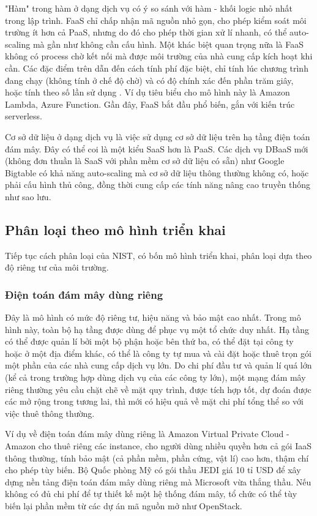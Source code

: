 \documentclass{article}
\begin{document}
"Hàm" trong hàm ở dạng dịch vụ có ý so sánh với hàm - khối logic nhỏ nhất trong
lập trình. FaaS chỉ chấp nhận mã nguồn nhỏ gọn, cho phép kiểm soát môi trường ít
hơn cả PaaS, nhưng do đó cho phép thời gian xử lí nhanh, có thể auto-scaling mà
gần như không cần cấu hình. Một khác biệt quan trọng nữa là FaaS không có
process chờ kết nối mà được môi trường của nhà cung cấp kích hoạt khi cần. Các
đặc điểm trên dẫn đến cách tính phí đặc biệt, chỉ tính lúc chương trình đang
chạy (không tính ở chế độ chờ) và có độ chính xác đến phần trăm giây, hoặc tính
theo số lần sử dụng \cite{CFPvF}. Ví dụ tiêu biểu cho mô hình này là Amazon
Lambda, Azure Function. Gần đây, FaaS bắt đầu phổ biến, gắn với kiến trúc
serverless.

Cơ sở dữ liệu ở dạng dịch vụ là việc sử dụng cơ sở dữ liệu trên hạ tầng điện
toán đám mây. Đây có thể coi là một kiểu SaaS hơn là PaaS. Các dịch vụ DBaaS mới
(không đơn thuần là SaaS với phần mềm cơ sở dữ liệu có sẵn) như Google Bigtable
có khả năng auto-scaling mà cơ sở dữ liệu thông thường không có, hoặc phải cấu
hình thủ công, đồng thời cung cấp các tính năng nâng cao truyền thống như sao
lưu.

\subsection{Phân loại theo mô hình triển khai}

Tiếp tục cách phân loại của NIST, có bốn mô hình triển khai, phân loại dựa theo
độ riêng tư của môi trường.

\subsubsection{Điện toán đám mây dùng riêng}

Đây là mô hình có mức độ riêng tư, hiệu năng và bảo mật cao nhất. Trong mô hình
này, toàn bộ hạ tầng được dùng để phục vụ một tổ chức duy nhất. Hạ tầng có thể
được quản lí bởi một bộ phận hoặc bên thứ ba, có thể đặt tại công ty hoặc ở một
địa điểm khác, có thể là công ty tự mua và cài đặt hoặc thuê trọn gói một phần
của các nhà cung cấp dịch vụ lớn. Do chi phí đầu tư và quản lí quá lớn (kể cả
trong trường hợp dùng dịch vụ của các công ty lớn), một mạng đám mây riêng
thường yêu cầu chặt chẽ về mặt quy trình, được tích hợp tốt, dự đoán được các mở
rộng trong tương lai, thì mới có hiệu quả về mặt chi phí tổng thể so với việc
thuê thông thường.

Ví dụ về điện toán đám mây dùng riêng là Amazon Virtual Private Cloud - Amazon
cho thuê riêng các instance, cho người dùng nhiều quyền hơn cả gói IaaS thông
thường, tính bảo mật (cả phần mềm, phần cứng, vật lí) cao hơn, thậm chí cho phép
tùy biến. Bộ Quốc phòng Mỹ có gói thầu JEDI giá 10 tỉ USD để xây dựng nền tảng
điện toán đám mây dùng riêng mà Microsoft vừa thắng thầu. Nếu không có đủ chi
phí để tự thiết kế một hệ thống đám mây, tổ chức có thể tùy biến lại phần mềm từ
các dự án mã nguồn mở như OpenStack.
\end{document}

